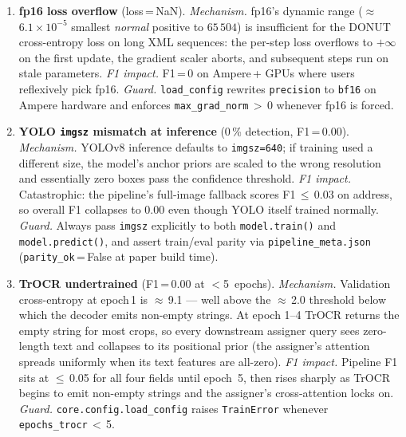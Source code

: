 \documentclass[conference]{IEEEtran}
\begin{document}
\begin{enumerate}
\item \textbf{fp16 loss overflow} (loss\,=\,NaN).
  \textit{Mechanism.} fp16's dynamic range
  ($\approx$\,$6.1{\times}10^{-5}$ smallest \emph{normal} positive
  to $65\,504$) is insufficient for
  the DONUT cross-entropy loss on long XML sequences: the per-step
  loss overflows to $+\infty$ on the first update, the gradient
  scaler aborts, and subsequent steps run on stale parameters.
  \textit{F1 impact.} F1\,=\,0 on Ampere\,+ GPUs where users
  reflexively pick fp16.  \textit{Guard.} \texttt{load\_config}
  rewrites \texttt{precision} to \texttt{bf16} on Ampere hardware
  and enforces \texttt{max\_grad\_norm}\,$>$\,0 whenever fp16 is
  forced.

\item \textbf{YOLO \texttt{imgsz} mismatch at inference}
  (0\,\% detection, F1\,=\,0.00).
  \textit{Mechanism.} YOLOv8 inference defaults to
  \texttt{imgsz=640}; if training used a different size, the model's
  anchor priors are scaled to the wrong resolution and essentially
  zero boxes pass the confidence threshold.  \textit{F1 impact.}
  Catastrophic: the pipeline's full-image fallback scores
  F1\,$\leq$\,0.03 on address, so overall F1 collapses to 0.00
  even though YOLO itself trained normally.  \textit{Guard.} Always
  pass \texttt{imgsz} explicitly to both \texttt{model.train()} and
  \texttt{model.predict()}, and assert train/eval parity via
  \texttt{pipeline\_meta.json}
  (\texttt{parity\_ok}\,=\,False at paper build time).

\item \textbf{TrOCR undertrained} (F1\,=\,0.00 at $<$5~epochs).
  \textit{Mechanism.} Validation cross-entropy at epoch\,1 is
  $\approx$\,9.1 --- well above the $\approx$\,2.0 threshold below
  which the decoder emits non-empty strings.  At epoch 1--4 TrOCR
  returns the empty string for most crops, so every downstream
  assigner query sees zero-length text and collapses to its positional
  prior (the assigner's attention spreads uniformly when its text
  features are all-zero).  \textit{F1 impact.} Pipeline F1 sits at
  $\leq$\,0.05 for all four fields until epoch~5, then rises sharply
  as TrOCR begins to emit non-empty strings and the assigner's
  cross-attention locks on.  \textit{Guard.}
  \texttt{core.config.load\_config} raises \texttt{TrainError}
  whenever \texttt{epochs\_trocr}\,$<$\,5.


\end{enumerate}
\end{document}
